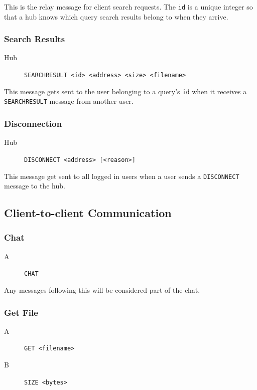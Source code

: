 \documentclass{article}
\begin{document}
This is the relay message for client search requests.  The \verb+id+ is a unique integer so that a hub knows which query search results belong to when they arrive.

\subsubsection{Search Results}
\begin{description}
\item[Hub] \verb+SEARCHRESULT <id> <address> <size> <filename>+
\end{description}

This message gets sent to the user belonging to a query's \verb+id+ when it receives a \verb+SEARCHRESULT+ message from another user.

\subsubsection{Disconnection}
\begin{description}
\item[Hub] \verb+DISCONNECT <address> [<reason>]+
\end{description}

This message get sent to all logged in users when a user sends a \verb+DISCONNECT+ message to the hub.

\subsection{Client-to-client Communication}

\subsubsection{Chat}
\begin{description}
\item[A] \verb+CHAT+
\end{description}

Any messages following this will be considered part of the chat.

\subsubsection{Get File}
\begin{description}
\item[A] \verb+GET <filename>+
\item[B] \verb+SIZE <bytes>+
\end{description}
\end{document}
